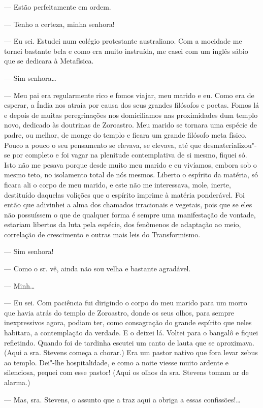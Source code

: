 --- Estão perfeitamente em ordem.

--- Tenho a certeza, minha senhora!

--- Eu sei. Estudei num colégio protestante australiano. Com a mocidade
me tornei bastante bela e como era muito instruída, me casei com um
inglês sábio que se dedicara à Metafísica.

--- Sim senhora\ldots{}

--- Meu pai era regularmente rico e fomos viajar, meu marido e eu. Como
era de esperar, a Índia nos atraía por causa dos seus grandes filósofos
e poetas. Fomos lá e depois de muitas peregrinações nos domiciliamos nas
proximidades dum templo novo, dedicado às doutrinas de Zoroastro. Meu
marido se tornara uma espécie de padre, ou melhor, de monge do templo e
ficara um grande filósofo meta físico. Pouco a pouco o seu pensamento se
elevava, se elevava, até que desmaterializou"-se por completo e foi vagar
na plenitude contemplativa de si mesmo, fiquei só. Isto não me pesava
porque desde muito meu marido e eu vivíamos, embora sob o mesmo teto, no
isolamento total de nós mesmos. Liberto o espírito da matéria, só ficara
ali o corpo de meu marido, e este não me interessava, mole, inerte,
destituído daquelas volições que o espírito imprime à matéria
ponderável. Foi então que adivinhei a alma dos chamados irracionais e
vegetais, pois que se eles não possuíssem o que de qualquer forma é
sempre uma manifestação de vontade, estariam libertos da luta pela
espécie, dos fenômenos de adaptação ao meio, correlação de crescimento e
outras mais leis do Transformismo.

--- Sim senhora!

--- Como o sr. vê, ainda não sou velha e bastante agradável.

--- Minh\ldots{}

--- Eu sei. Com paciência fui dirigindo o corpo do meu marido para um
morro que havia atrás do templo de Zoroastro, donde os seus olhos, para
sempre inexpressivos agora, podiam ter, como consagração do grande
espírito que neles habitara, a contemplação da verdade. E o deixei lá.
Voltei para o bangalô e fiquei refletindo. Quando foi de tardinha
escutei um canto de lauta que se aproximava. (Aqui a sra. Stevens começa
a chorar.) Era um pastor nativo que fora levar zebus ao templo. Dei"-lhe
hospitalidade, e como a noite viesse muito ardente e silenciosa, pequei
com esse pastor! (Aqui os olhos da sra. Stevens tomam ar de alarma.)

--- Mas, sra. Stevens, o assunto que a traz aqui a obriga a essas
confissões!\ldots{}

